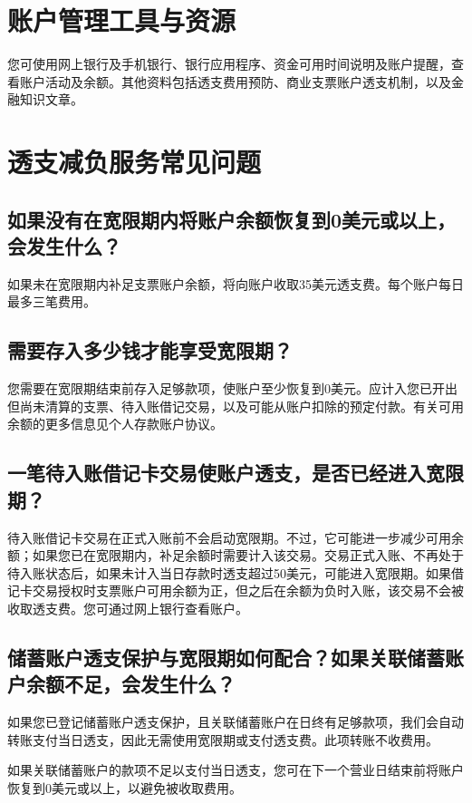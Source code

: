 \documentclass[UTF8,fontset=none,11pt,a4paper]{ctexart}
\begin{document}
\section*{账户管理工具与资源}
您可使用网上银行及手机银行、银行应用程序、资金可用时间说明及账户提醒，查看账户活动及余额。其他资料包括透支费用预防、商业支票账户透支机制，以及金融\allowbreak\mbox{知识文章。}


\section*{透支减负服务常见问题}
\subsection*{如果没有在宽限期内将账户余额恢复到0美元或以上，会发生什么？}
如果未在宽限期内补足支票账户余额，将向账户收取35美元透支费。每个账户每日最多\allowbreak\mbox{三笔费用。}


\subsection*{需要存入多少钱才能享受宽限期？}
您需要在宽限期结束前存入足够款项，使账户至少恢复到0美元。应计入您已开出但尚未清算的支票、待入账借记交易，以及可能从账户扣除的预定付款。有关可用余额的更多信息见个人存款\allowbreak\mbox{账户协议。}


\subsection*{一笔待入账借记卡交易使账户透支，是否已经进入宽限期？}
待入账借记卡交易在正式入账前不会启动宽限期。不过，它可能进一步减少可用余额；如果您已在宽限期内，补足余额时需要计入该交易。交易正式入账、不再处于待入账状态后，如果未计入当日存款时透支超过50美元，可能进入宽限期。如果借记卡交易授权时支票账户可用余额为正，但之后在余额为负时入账，该交易不会被收取透支费。您可通过网上银行\allowbreak\mbox{查看账户。}


\subsection*{储蓄账户透支保护与宽限期如何配合？如果关联储蓄账户余额不足，会发生什么？}
如果您已登记储蓄账户透支保护，且关联储蓄账户在日终有足够款项，我们会自动转账支付当日透支，因此无需使用宽限期或支付透支费。此项转账\allowbreak\mbox{不收费用。}


如果关联储蓄账户的款项不足以支付当日透支，您可在下一个营业日结束前将账户恢复到0美元或以上，以避免被\allowbreak\mbox{收取费用。}
\end{document}
